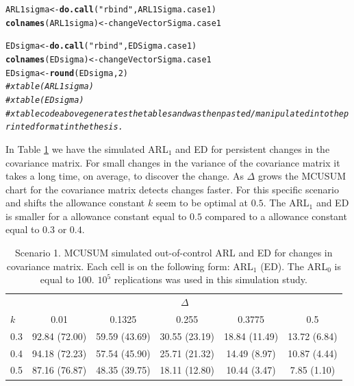 \documentclass[a4paper,11pt,fleqn,twoside,notitlepage]{report}
\makeatletter
\newcommand{\hlnum}[1]{\textcolor[rgb]{0.686,0.059,0.569}{#1}}%
\newcommand{\hlstr}[1]{\textcolor[rgb]{0.192,0.494,0.8}{#1}}%
\newcommand{\hlcom}[1]{\textcolor[rgb]{0.678,0.584,0.686}{\textit{#1}}}%
\newcommand{\hlstd}[1]{\textcolor[rgb]{0.345,0.345,0.345}{#1}}%
\newcommand{\hlkwb}[1]{\textcolor[rgb]{0.69,0.353,0.396}{#1}}%
\newcommand{\hlkwd}[1]{\textcolor[rgb]{0.737,0.353,0.396}{\textbf{#1}}}%
\newenvironment{kframe}{%
 \def\at@end@of@kframe{}%
 \ifinner\ifhmode%
  \def\at@end@of@kframe{\end{minipage}}%
  \begin{minipage}{\columnwidth}%
 \fi\fi%
 \def\FrameCommand##1{\hskip\@totalleftmargin \hskip-\fboxsep
 \colorbox{shadecolor}{##1}\hskip-\fboxsep
     \hskip-\linewidth \hskip-\@totalleftmargin \hskip\columnwidth}%
 \MakeFramed {\advance\hsize-\width
   \@totalleftmargin\z@ \linewidth\hsize
   \@setminipage}}%
 {\par\unskip\endMakeFramed%
 \at@end@of@kframe}
\newenvironment{knitrout}{}{} %
\makeatother
\begin{document}
\begin{knitrout}
\color{fgcolor}\begin{kframe}
\begin{alltt}
\hlstd{ARL1sigma} \hlkwb{<-} \hlkwd{do.call}\hlstd{(}\hlstr{"rbind"}\hlstd{,ARL1Sigma.case1)}
\hlkwd{colnames}\hlstd{(ARL1sigma)} \hlkwb{<-}  \hlstd{changeVectorSigma.case1}

\hlstd{EDsigma} \hlkwb{<-} \hlkwd{do.call}\hlstd{(}\hlstr{"rbind"}\hlstd{, EDSigma.case1)}
\hlkwd{colnames}\hlstd{(EDsigma)} \hlkwb{<-}  \hlstd{changeVectorSigma.case1}
\hlstd{EDsigma}\hlkwb{<-} \hlkwd{round}\hlstd{(EDsigma,}\hlnum{2}\hlstd{)}
\hlcom{#xtable(ARL1sigma)}
\hlcom{#xtable(EDsigma)}
\hlcom{# xtable code above generates the tables and was then pasted/manipulated into the printed format in the thesis. }
\end{alltt}
\end{kframe}
\end{knitrout}
In Table \ref{LongTable1} we have the simulated ARL$_1$ and ED for persistent changes in the covariance matrix. For small changes in the variance of the covariance matrix it takes a long time, on average, to discover the change. As $\Delta$ grows the MCUSUM chart for the covariance matrix detects changes faster. For this specific scenario and shifts the allowance constant $k$ seem to be optimal at $0.5$. The ARL$_1$ and ED is smaller for a allowance constant equal to $0.5$ compared to a allowance constant equal to $0.3$ or $0.4$.
\begin{table}[ht]
\centering
\caption{Scenario 1. MCUSUM simulated out-of-control ARL and ED for changes in covariance matrix. Each cell is on the following form: ARL$_1$ (ED). The ARL$_0$ is equal to 100. $10^5$ replications was used in this simulation study.\label{LongTable1}}
\begin{tabular}{lccccc}
\toprule
& \multicolumn{5}{c}{$\Delta$} \\ \cmidrule(r){2-6}
$k$ & 0.01 & 0.1325 & 0.255 & 0.3775 & 0.5 \\[0.1cm]
\midrule
\rowcolor[gray]{.9}  0.3 & 92.84 (72.00) & 59.59 (43.69) & 30.55 (23.19) & 18.84 (11.49) & 13.72 (6.84) \\[0.1cm]
\midrule
\rowcolor[gray]{.85}  0.4 & 94.18 (72.23) &  57.54 (45.90) & 25.71 (21.32) & 14.49 (8.97) & 10.87 (4.44) \\[0.1cm]
\midrule
\rowcolor[gray]{.9}  0.5 & 87.16 (76.87) & 48.35 (39.75) & 18.11 (12.80) & 10.44 (3.47) & 7.85 (1.10) \\[0.1cm] 
\bottomrule
\end{tabular}
\end{table}
\end{document}
